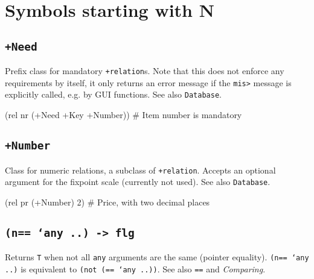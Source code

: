 %
%
%



\chapter{Symbols starting with N}
\label{cha:func-ref-N-functions-starting-with-N}

\section*{\texttt{+Need}}
\label{sec:func-ref-N-+Need}


Prefix class for mandatory \texttt{+relation}s. Note that this does not enforce
any requirements by itself, it only returns an error message if the
\texttt{mis>} message is explicitly called, e.g. by GUI functions. See also
\texttt{Database}.


\begin{wideverbatim}
(rel nr (+Need +Key +Number))  # Item number is mandatory
\end{wideverbatim}

 
\section*{\texttt{+Number}}
\label{sec:func-ref-N-+Number}


Class for numeric relations, a subclass of \texttt{+relation}. Accepts an
optional argument for the fixpoint scale (currently not used). See also
\texttt{Database}.


\begin{wideverbatim}
(rel pr (+Number) 2)  # Price, with two decimal places
\end{wideverbatim}

 
\section*{\texttt{(n== `any ..) -> flg}}
\label{sec:func-ref-N-(n== `any ..) -> flg}


Returns \texttt{T} when not all \texttt{any} arguments are the same (pointer
equality). \texttt{(n== `any ..)} is equivalent to \texttt{(not (== `any ..))}. See
also \texttt{==} and \emph{Comparing}.


